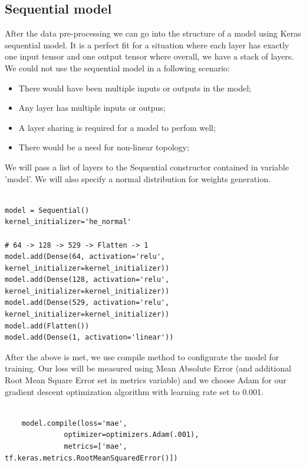 \documentclass[a4paper,oneside,openright,11pt]{book}
\begin{document}
\subsection{Sequential model}

After the data pre-processing we can go into the structure of a model using Keras sequential model. It is a perfect fit for a situation where each layer has exactly one input tensor and one output tensor where overall, we have a stack of layers. We could not use the sequential model in a following scenario:

\begin{itemize}
    \item There would have been multiple inputs or outputs in the model;
    \item Any layer has multiple inputs or outpus;
    \item A layer sharing is required for a model to perfom well;
    \item There would be a need for non-linear topology;
\end{itemize}


\noindent
We will pass a list of layers to the Sequential constructor contained in variable 'model'. We will also specify a normal distribution for weights generation.

\begin{verbatim}

model = Sequential()
kernel_initializer='he_normal'

# 64 -> 128 -> 529 -> Flatten -> 1
model.add(Dense(64, activation='relu', kernel_initializer=kernel_initializer))
model.add(Dense(128, activation='relu', kernel_initializer=kernel_initializer))
model.add(Dense(529, activation='relu', kernel_initializer=kernel_initializer))
model.add(Flatten())
model.add(Dense(1, activation='linear'))
\end{verbatim}


After the above is met, we use compile method to configurate the model for training. Our loss will be measured using Mean Absolute Error (and additional Root Mean Square Error set in metrics variable) and we choose Adam for our gradient descent optimization algorithm with learning rate set to 0.001.

\begin{verbatim}
    
    model.compile(loss='mae',
              optimizer=optimizers.Adam(.001),
              metrics=['mae', tf.keras.metrics.RootMeanSquaredError()])
    
\end{verbatim}
\end{document}

